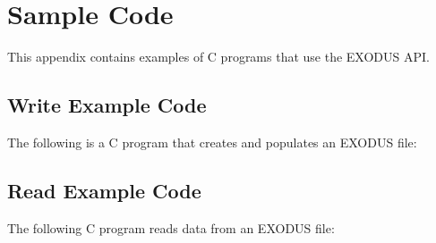 \chapter{Sample Code}
This appendix contains examples of C programs that use the EXODUS
API.  

\section{Write Example Code}

The following is a C program that creates and populates an EXODUS
file:

\newpage
\section{Read Example Code}

The following C program reads data from an EXODUS file:


